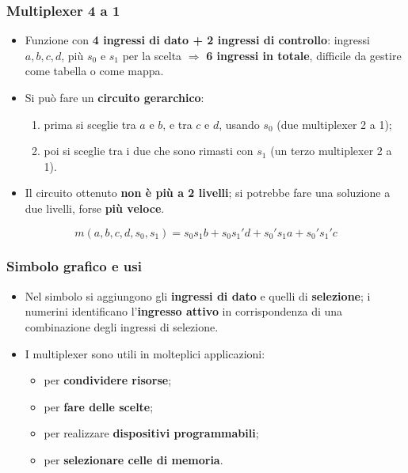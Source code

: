 \documentclass[12pt, a4paper]{article}
\begin{document}
\subsubsection{Multiplexer 4 a 1}
\begin{itemize}
    \item Funzione con \textbf{4 ingressi di dato + 2 ingressi di controllo}: ingressi $a, b, c, d$, più $s_0$ e $s_1$ per la scelta $\Rightarrow$ \textbf{6 ingressi in totale}, difficile da gestire come tabella o come mappa.
    \item Si può fare un \textbf{circuito gerarchico}:
    \begin{enumerate}
        \item prima si sceglie tra $a$ e $b$, e tra $c$ e $d$, usando $s_0$ (due multiplexer 2 a 1);
        \item poi si sceglie tra i due che sono rimasti con $s_1$ (un terzo multiplexer 2 a 1).
    \end{enumerate}
    \item Il circuito ottenuto \textbf{non è più a 2 livelli}; si potrebbe fare una soluzione a due livelli, forse \textbf{più veloce}.
\end{itemize}

\begin{tcolorbox}[colback=blue!5!white, colframe=blue!60!black, title=\textbf{Funzione del multiplexer 4 a 1}]
$$m(a,b,c,d,s_0,s_1) = s_0 s_1 b + s_0 s_1' d + s_0' s_1 a + s_0' s_1' c$$
\end{tcolorbox}


\subsubsection{Simbolo grafico e usi}
\begin{itemize}
    \item Nel simbolo si aggiungono gli \textbf{ingressi di dato} e quelli di \textbf{selezione}; i numerini identificano l'\textbf{ingresso attivo} in corrispondenza di una combinazione degli ingressi di selezione.
    \item I multiplexer sono utili in molteplici applicazioni:
    \begin{itemize}
        \item per \textbf{condividere risorse};
        \item per \textbf{fare delle scelte};
        \item per realizzare \textbf{dispositivi programmabili};
        \item per \textbf{selezionare celle di memoria}.
    \end{itemize}
\end{itemize}
\end{document}
